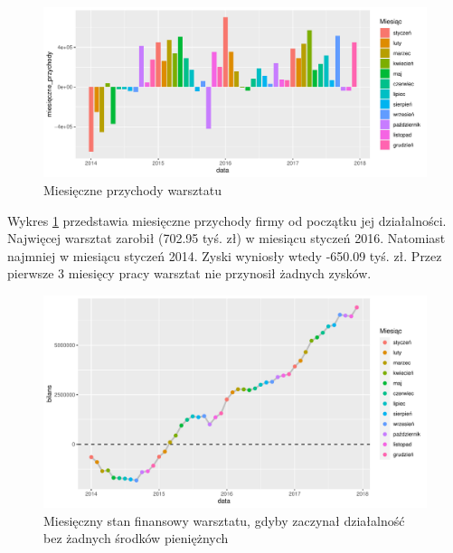 \documentclass{article}\usepackage[]{graphicx}\usepackage[]{xcolor}
\makeatletter
\def\maxwidth{ %
  \ifdim\Gin@nat@width>\linewidth
    \linewidth
  \else
    \Gin@nat@width
  \fi
}
\newenvironment{knitrout}{}{} %
\makeatother
\begin{document}
\begin{knitrout}
\color{fgcolor}\begin{figure}[H]

{\centering \includegraphics[width=\maxwidth]{figure/fig_bilans-1} 

}

\caption[Miesięczne przychody warsztatu]{Miesięczne przychody warsztatu}\label{fig:fig_bilans}
\end{figure}

\end{knitrout}


Wykres \ref{fig:fig_bilans} przedstawia miesięczne przychody firmy od początku jej działalności. 
Najwięcej warsztat zarobił (702.95 tyś. zł) w miesiącu styczeń 2016.
Natomiast najmniej w miesiącu styczeń 2014. Zyski wyniosły wtedy -650.09 tyś. zł. Przez pierwsze 3 miesięcy pracy warsztat nie przynosił żadnych zysków.

\begin{knitrout}
\color{fgcolor}\begin{figure}[H]

{\centering \includegraphics[width=\maxwidth]{figure/fig_bilans_suma-1} 

}

\caption[Miesięczny stan finansowy warsztatu, gdyby zaczynał działalność bez żadnych środków pieniężnych]{Miesięczny stan finansowy warsztatu, gdyby zaczynał działalność bez żadnych środków pieniężnych}\label{fig:fig_bilans_suma}
\end{figure}

\end{knitrout}
\end{document}
